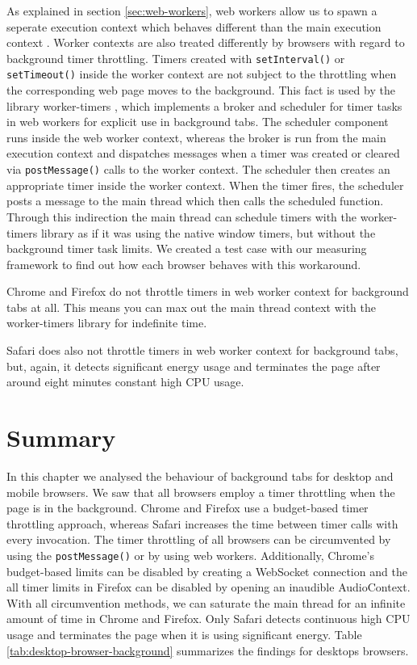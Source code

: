 \documentclass[
	ruledheaders=section,%
	class=report,%
	thesis={type=bachelor},%
	accentcolor=9c,%
	custommargins=true,%
	marginpar=false,%
	parskip=half-,%
	fontsize=11pt,%
]{tudapub}
\begin{document}
  As explained in section \ref{sec:web-workers}, web workers allow us to spawn a seperate execution context which behaves different than the main execution context \cite{mdn-worker}. Worker contexts are also treated differently by browsers with regard to background timer throttling. Timers created with \texttt{setInterval()} or \texttt{setTimeout()} inside the worker context are not subject to the throttling when the corresponding web page moves to the background. This fact is used by the library worker-timers \cite{worker-timers}, which implements a broker and scheduler for timer tasks in web workers for explicit use in background tabs. The scheduler component runs inside the web worker context, whereas the broker is run from the main execution context and dispatches messages when a timer was created or cleared via \texttt{postMessage()} calls to the worker context. The scheduler then creates an appropriate timer inside the worker context. When the timer fires, the scheduler posts a message to the main thread which then calls the scheduled function. Through this indirection the main thread can schedule timers with the worker-timers library as if it was using the native window timers, but without the background timer task limits. We created a test case with our measuring framework to find out how each browser behaves with this workaround.
  
  Chrome and Firefox do not throttle timers in web worker context for background tabs at all. This means you can max out the main thread context with the worker-timers library for indefinite time.

  Safari does also not throttle timers in web worker context for background tabs, but, again, it detects significant energy usage and terminates the page after around eight minutes constant high CPU usage. 
  
  
  \section{Summary}

  In this chapter we analysed the behaviour of background tabs for desktop and mobile browsers. We saw that all browsers employ a timer throttling when the page is in the background. Chrome and Firefox use a budget-based timer throttling approach, whereas Safari increases the time between timer calls with every invocation. The timer throttling of all browsers can be circumvented by using the \texttt{postMessage()} or by using web workers. Additionally, Chrome's budget-based limits can be disabled by creating a WebSocket connection and the all timer limits in Firefox can be disabled by opening an inaudible AudioContext. With all circumvention methods, we can saturate the main thread for an infinite amount of time in Chrome and Firefox. Only Safari detects continuous high CPU usage and terminates the page when it is using significant energy. Table \ref{tab:desktop-browser-background} summarizes the findings for desktops browsers.
\end{document}
